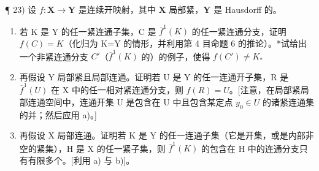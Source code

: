 ¶ 23) 设 \(f: \mathbf{X} \to \mathbf{Y}\) 是连续开映射，其中 \(\mathbf{X}\) 局部紧，\(\mathbf{Y}\) 是 Hausdorff 的。

\begin{enumerate}
\def\labelenumi{\alph{enumi})}
\item
  若 K 是 Y 的任一紧连通子集，C 是 \(\overline{f}^{1}(K)\) 的任一紧连通分支，证明 \(f(C)=K\)（化归为 K=Y 的情形，并利用第 4 目命题 6 的推论）。*试给出一个非紧连通分支 \(C'\)（\(\overline{f}^{1}(K)\) 的）的例子，使得 \(f(C')\neq K_*\)
\item
  再假设 Y 局部紧且局部连通。证明若 U 是 Y 的任一连通开子集，R 是 \(\overline{f}^{1}(U)\) 在 X 中的任一相对紧连通分支，则 \(f(R)=U\)。{[}注意，在局部紧局部连通空间中，连通开集 U 是包含在 U 中且包含某定点 \(y_{0}\in U\) 的诸紧连通集的并；然后应用 a)。{]}
\item
  再假设 X 局部连通。证明若 K 是 Y 的任一连通子集（它是开集，或是内部非空的紧集），H 是 X 的任一紧子集，则 \(\overline{f}^{1}(K)\) 的包含在 H 中的连通分支只有有限多个。{[}利用 a) 与 b){]}。
\end{enumerate}

